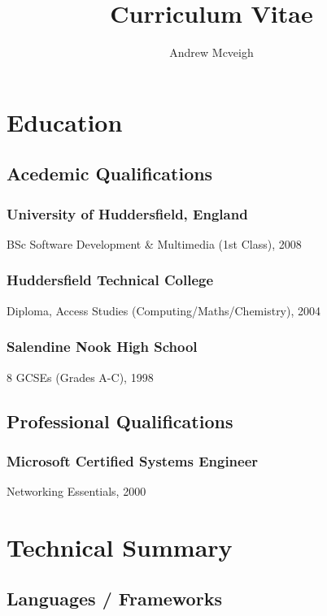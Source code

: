 \documentclass{article}
\title{}
\author{Andrew Mcveigh}
\date{}
\begin{document}
\title{\vspace{-20mm}\textbf{Curriculum Vitae}}
\maketitle

\section*{Education}
\label{sec-1}

\subsection*{Acedemic Qualifications}
\label{sec-1.1}

\subsubsection*{University of Huddersfield, England}
\label{sec-1.1.1}

BSc Software Development \& Multimedia (1st Class), 2008
\subsubsection*{Huddersfield Technical College}
\label{sec-1.1.2}

Diploma, Access Studies (Computing/Maths/Chemistry), 2004
\subsubsection*{Salendine Nook High School}
\label{sec-1.1.3}

8 GCSEs (Grades A-C), 1998
\subsection*{Professional Qualifications}
\label{sec-1.2}

\subsubsection*{Microsoft Certified Systems Engineer}
\label{sec-1.2.1}

    Networking Essentials, 2000
\section*{Technical Summary}
\label{sec-2}

\subsection*{Languages / Frameworks}
\label{sec-2.1}
\end{document}
